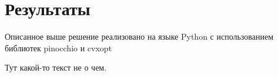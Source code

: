 \section{Результаты}

Описанное выше решение реализовано на языке Python с использованием библиотек pinocchio \cite{Pinocchio} и cvxopt \cite{CVXOPT}

Тут какой-то текст не о чем.


